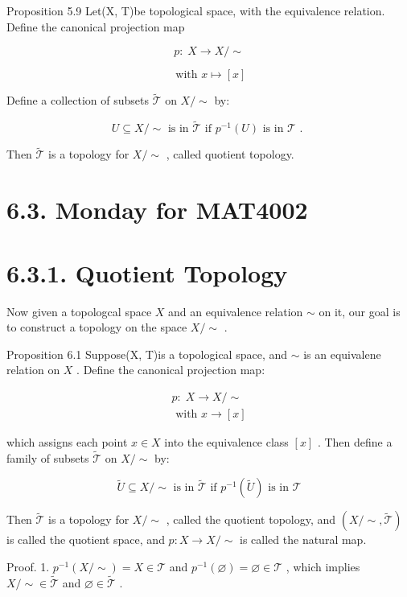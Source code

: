 Proposition 5.9 Let(X, T)be topological space, with the equivalence relation. Define the canonical projection map

\[
p : \;X \rightarrow  X/ \sim
\]

\[
\text{ with }x \mapsto  \left\lbrack  x\right\rbrack
\]

Define a collection of subsets \(\widetilde{\mathcal{T}}\) on \(X/ \sim\) by:

\[
U \subseteq  X/ \sim  \text{ is in }\widetilde{\mathcal{T}}\text{ if }{p}^{-1}\left( U\right) \text{ is in }\mathcal{T}\text{ . }
\]

Then \(\widetilde{\mathcal{T}}\) is a topology for \(X/ \sim\) , called quotient topology.

\section*{6.3. Monday for MAT4002}

\section*{6.3.1. Quotient Topology}

Now given a topologcal space \(X\) and an equivalence relation \(\sim\) on it, our goal is to construct a topology on the space \(X/ \sim\) .

Proposition 6.1 Suppose(X, T)is a topological space, and \(\sim\) is an equivalene relation on \(X\) . Define the canonical projection map:

\[
\begin{array}{l} p : \;X \rightarrow  X/ \sim  \\  \text{ with }x \rightarrow  \left\lbrack  x\right\rbrack   \end{array}
\]

which assigns each point \(x \in  X\) into the equivalence class \(\left\lbrack  x\right\rbrack\) . Then define a family of subsets \(\widetilde{\mathcal{T}}\) on \(X/ \sim\) by:

\[
\widetilde{U} \subseteq  X/ \sim  \text{ is in }\widetilde{\mathcal{T}}\text{ if }{p}^{-1}\left( \widetilde{U}\right) \text{ is in }\mathcal{T}
\]

Then \(\widetilde{\mathcal{T}}\) is a topology for \(X/ \sim\) , called the quotient topology, and \(\left( {X/ \sim  ,\widetilde{\mathcal{T}}}\right)\) is called the quotient space, and \(p : X \rightarrow  X/ \sim\) is called the natural map.

Proof. 1. \({p}^{-1}\left( {X/ \sim  }\right)  = X \in  \mathcal{T}\) and \({p}^{-1}\left( \varnothing \right)  = \varnothing  \in  \mathcal{T}\) , which implies \(X/ \sim   \in  \widetilde{\mathcal{T}}\) and \(\varnothing  \in  \widetilde{\mathcal{T}}\) .

